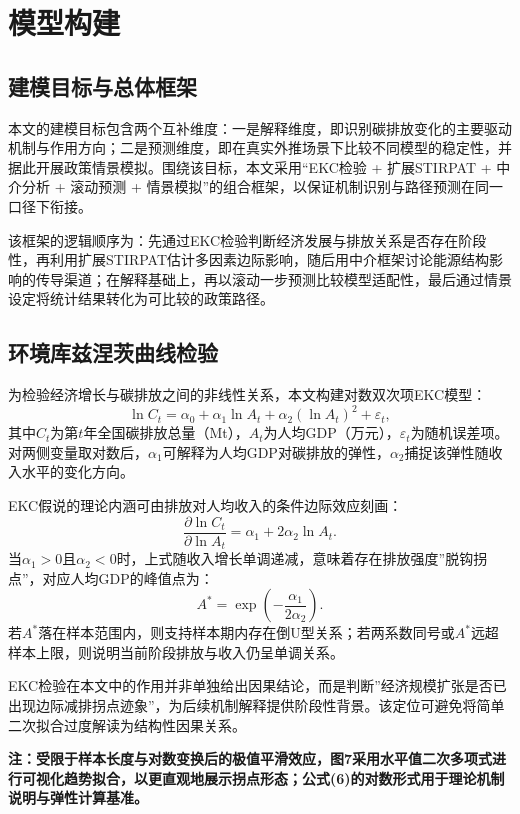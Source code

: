 \section{模型构建}
\subsection{建模目标与总体框架}
本文的建模目标包含两个互补维度：一是解释维度，即识别碳排放变化的主要驱动机制与作用方向；二是预测维度，即在真实外推场景下比较不同模型的稳定性，并据此开展政策情景模拟。围绕该目标，本文采用“EKC检验 + 扩展STIRPAT + 中介分析 + 滚动预测 + 情景模拟”的组合框架，以保证机制识别与路径预测在同一口径下衔接。

该框架的逻辑顺序为：先通过EKC检验判断经济发展与排放关系是否存在阶段性，再利用扩展STIRPAT估计多因素边际影响，随后用中介框架讨论能源结构影响的传导渠道；在解释基础上，再以滚动一步预测比较模型适配性，最后通过情景设定将统计结果转化为可比较的政策路径。

\subsection{环境库兹涅茨曲线检验}
为检验经济增长与碳排放之间的非线性关系，本文构建对数双次项EKC模型：
\begin{equation}
\ln C_t = \alpha_0 + \alpha_1 \ln A_t + \alpha_2 (\ln A_t)^2 + \varepsilon_t,
\end{equation}
其中$C_t$为第$t$年全国碳排放总量（Mt），$A_t$为人均GDP（万元），$\varepsilon_t$为随机误差项。对两侧变量取对数后，$\alpha_1$可解释为人均GDP对碳排放的弹性，$\alpha_2$捕捉该弹性随收入水平的变化方向。

EKC假说的理论内涵可由排放对人均收入的条件边际效应刻画：
\begin{equation}
\frac{\partial \ln C_t}{\partial \ln A_t} = \alpha_1 + 2\alpha_2 \ln A_t.
\end{equation}
当$\alpha_1>0$且$\alpha_2<0$时，上式随收入增长单调递减，意味着存在排放强度”脱钩拐点”，对应人均GDP的峰值点为：
\begin{equation}
A^* = \exp\!\left(-\frac{\alpha_1}{2\alpha_2}\right).
\end{equation}
若$A^*$落在样本范围内，则支持样本期内存在倒U型关系；若两系数同号或$A^*$远超样本上限，则说明当前阶段排放与收入仍呈单调关系。

EKC检验在本文中的作用并非单独给出因果结论，而是判断”经济规模扩张是否已出现边际减排拐点迹象”，为后续机制解释提供阶段性背景。该定位可避免将简单二次拟合过度解读为结构性因果关系。

{\songti\bfseries{}注：受限于样本长度与对数变换后的极值平滑效应，图7采用水平值二次多项式进行可视化趋势拟合，以更直观地展示拐点形态；公式(6)的对数形式用于理论机制说明与弹性计算基准。}

